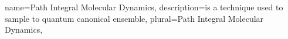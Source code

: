 

{
  name=Path Integral Molecular Dynamics,
  description={is a technique used to sample to quantum canonical ensemble},
  plural=Path Integral Molecular Dynamics,
}


\makeglossaries
